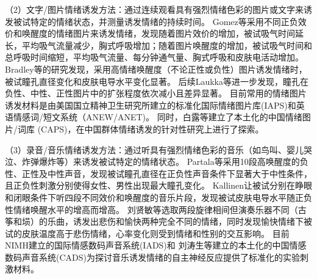     
（2）文字/图片情绪诱发方法：通过连续观看具有强烈情绪色彩的图片或文字来诱发被试特定的情绪状态，并测量诱发情绪的持续时间。
Gomez等\cite{Gomez2004}采用不同正负效价和唤醒度的情绪图片来诱发情绪，发现随着图片效价的增加，被试吸气时间延长，平均吸气流量减少，胸式呼吸增加；随着图片唤醒度的增加，被试吸气时间和总呼吸时间缩短，平均吸气流量、每分钟通气量、胸式呼吸和皮肤电活动增加。
Bradley等\cite{Bradley2008}的研究发现，采用高情绪唤醒度（不论正性或负性）图片诱发情绪时，被试瞳孔直径变化和皮肤电导水平变化显著。
后续Laukka等\cite{Laukka2013}进一步发现，瞳孔在负性、中性、正性图片中的扩张程度依次减小且差异显著。
目前常用的情绪图片诱发材料是由美国国立精神卫生研究所建立的标准化国际情绪图片库(IAPS)和英语情感词/短文系统（ANEW/ANET)。
同时，白露等\cite{BaiLu2005}建立了本土化的中国情绪图片/词库 (CAPS)，在中国群体情绪诱发的针对性研究上进行了探索。

    
（3）录音/音乐情绪诱发方法：通过听具有强烈情绪色彩的音乐（如鸟叫、婴儿哭泣、炸弹爆炸等）来诱发被试特定的情绪状态。
Partala等\cite{Partala2003}采用10段高唤醒度的负性、正性及中性声音，发现被试瞳孔直径在正负性声音条件下显著大于中性条件，且正负性刺激分别使得女性、男性出现最大瞳孔变化。
Kallinen\cite{Kallinen2004}让被试分别在睁眼和闭眼条件下听四段不同效价和唤醒度的音乐片段，发现被试皮肤电导水平随正负性情绪唤醒水平的增高而增高。
刘贤敏等\cite{LiuXianmin2011}选取两段旋律相间但演奏乐器不同（古筝和埙）的乐曲，诱发出悲伤和愉快两种完全不同的情绪，同时发现愉快情绪下被试的皮肤温度高于悲伤情绪，心率变化则受到情绪和性别的交互影响。
目前NIMH建立的国际情感数码声音系统(IADS)和
刘涛生等\cite{LiuTaosheng2006}建立的本土化的中国情感数码声音系统(CADS)为探讨音乐诱发情绪的自主神经反应提供了标准化的实验刺激材料。


